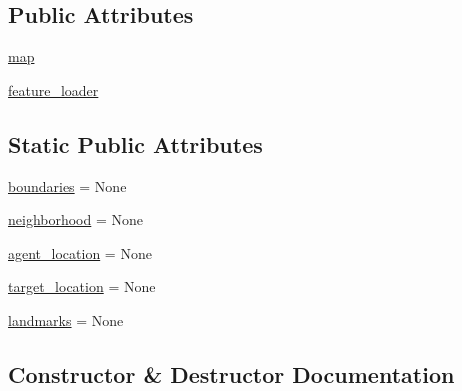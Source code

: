 \subsection*{Public Attributes}
\begin{DoxyCompactItemize}
\item 
\hyperlink{classparlai_1_1tasks_1_1talkthewalk_1_1worlds_1_1Simulator_a2e496f42b19dac1ad35d9604f63dd8e0}{map}
\item 
\hyperlink{classparlai_1_1tasks_1_1talkthewalk_1_1worlds_1_1Simulator_accbc4219f01217f9599c6560e34016fd}{feature\+\_\+loader}
\end{DoxyCompactItemize}
\subsection*{Static Public Attributes}
\begin{DoxyCompactItemize}
\item 
\hyperlink{classparlai_1_1tasks_1_1talkthewalk_1_1worlds_1_1Simulator_afb9280ec4243b403e5b8d7cf694dddd2}{boundaries} = None
\item 
\hyperlink{classparlai_1_1tasks_1_1talkthewalk_1_1worlds_1_1Simulator_a79e2dd5fa3d217ff8e909ef731e38314}{neighborhood} = None
\item 
\hyperlink{classparlai_1_1tasks_1_1talkthewalk_1_1worlds_1_1Simulator_a149433c72afebe5995a02d03133d4507}{agent\+\_\+location} = None
\item 
\hyperlink{classparlai_1_1tasks_1_1talkthewalk_1_1worlds_1_1Simulator_a3d22320d10a2fea9c185be6a0e7bc1fb}{target\+\_\+location} = None
\item 
\hyperlink{classparlai_1_1tasks_1_1talkthewalk_1_1worlds_1_1Simulator_a50902f5af0b1faf0225d13593436b393}{landmarks} = None
\end{DoxyCompactItemize}


\subsection{Constructor \& Destructor Documentation}
\mbox{\label{classparlai_1_1tasks_1_1talkthewalk_1_1worlds_1_1Simulator_af0dd9259b1847530dd06e97c004b4992}} 
